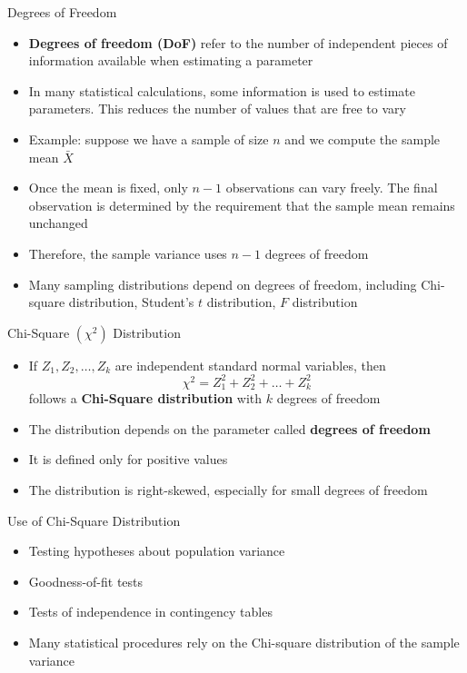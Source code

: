 \documentclass[12pt, aspectratio=169]{beamer}
\begin{document}
    \begin{frame}{Degrees of Freedom}
        \begin{itemize}
            \item \textbf{Degrees of freedom (DoF)} refer to the number of independent pieces of information available when estimating a parameter

            \item In many statistical calculations, some information is used to estimate parameters. This reduces the number of values that are free to vary

            \item Example: suppose we have a sample of size \(n\) and we compute the sample mean \(\bar{X}\)

            \item Once the mean is fixed, only \(n-1\) observations can vary freely. The final observation is determined by the requirement that the sample mean remains unchanged

            \item Therefore, the sample variance uses \(n-1\) degrees of freedom

            \item Many sampling distributions depend on degrees of freedom, including Chi-square distribution, Student's \(t\) distribution, \(F\) distribution
        \end{itemize}
    \end{frame}


    \begin{frame}{Chi-Square \((\chi^2)\) Distribution}
        \begin{itemize}
            \item If \(Z_1, Z_2, \dots, Z_k\) are independent standard normal variables, then
            \[
                \chi^2 = Z_1^2 + Z_2^2 + \dots + Z_k^2
            \]
            follows a \textbf{Chi-Square distribution} with \(k\) degrees of freedom
            \item The distribution depends on the parameter called \textbf{degrees of freedom}
            \item It is defined only for positive values
            \item The distribution is right-skewed, especially for small degrees of freedom
        \end{itemize}
    \end{frame}


    \begin{frame}{Use of Chi-Square Distribution}
        \begin{itemize}
            \item Testing hypotheses about population variance
            \item Goodness-of-fit tests
            \item Tests of independence in contingency tables
            \item Many statistical procedures rely on the Chi-square distribution of the sample variance
        \end{itemize}
    \end{frame}
\end{document}
